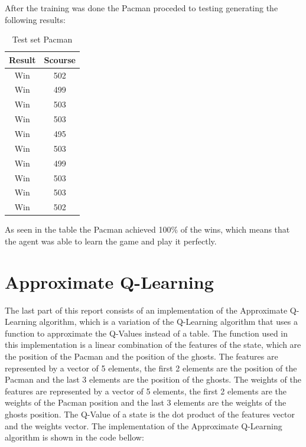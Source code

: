 \documentclass{article}
\begin{document}
After the training was done the Pacman proceded to testing generating the following results:

\begin{table}[!ht]
  \begin{center}
    \begin{tabular}{||c||c||}
      \hline
      Result & Scourse\\
      \hline\hline
      Win & 502 \\
      \hline\hline
      Win & 499 \\
      \hline
      Win & 503 \\
      \hline
      Win & 503 \\
      \hline
      Win & 495 \\
      \hline
      Win & 503 \\
      \hline
      Win & 499 \\
      \hline
      Win & 503 \\
      \hline
      Win & 503 \\
      \hline
      Win & 502 \\
      \hline
    \end{tabular}
    \caption{Test set Pacman}
    \label{tab:testPac}
  \end{center}
\end{table}

As seen in the table the Pacman achieved 100\% of the wins, which means that the agent was able to learn the game and play it perfectly.

\section{Approximate Q-Learning}

The last part of this report consists of an implementation of the Approximate Q-Learning algorithm, which is a variation of the Q-Learning algorithm that uses a function to approximate the Q-Values instead of a table.
The function used in this implementation is a linear combination of the features of the state, which are the position of the Pacman and the position of the ghosts.
The features are represented by a vector of 5 elements, the first 2 elements are the position of the Pacman and the last 3 elements are the position of the ghosts. 
The weights of the features are represented by a vector of 5 elements, the first 2 elements are the weights of the Pacman position and the last 3 elements are the weights of the ghosts position.
The Q-Value of a state is the dot product of the features vector and the weights vector.
The implementation of the Approximate Q-Learning algorithm is shown in the code bellow:
\end{document}
